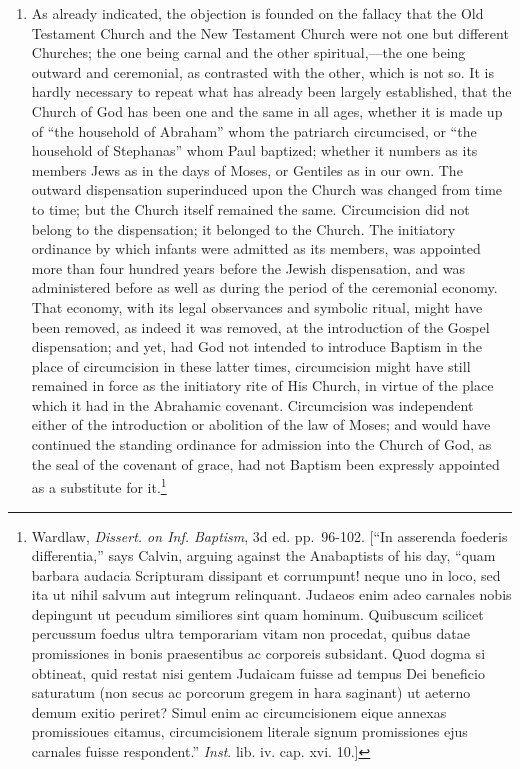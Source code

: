 \documentclass[]{book}
\providecommand{\tightlist}{%
  \setlength{\itemsep}{0pt}\setlength{\parskip}{0pt}}
\begin{document}
\begin{enumerate}
\def\labelenumi{\arabic{enumi}.}
\tightlist
\item
  As already indicated, the objection is founded on the fallacy that the Old Testament Church and the New Testament Church were not one but different Churches; the one being carnal and the other spiritual,---the one being outward and ceremonial, as contrasted with the other, which is not so. It is hardly necessary to repeat what has already been largely established, that the Church of God has been one and the same in all ages, whether it is made up of ``the household of Abraham'' whom the patriarch circumcised, or ``the household of Stephanas'' whom Paul baptized; whether it numbers as its members Jews as in the days of Moses, or Gentiles as in our own. The outward dispensation superinduced upon the Church was changed from time to time; but the Church itself remained the same. Circumcision did not belong to the dispensation; it belonged to the Church. The initiatory ordinance by which infants were admitted as its members, was appointed more than four hundred years before the Jewish dispensation, and was administered before as well as during the period of the ceremonial economy. That economy, with its legal observances and symbolic ritual, might have been removed, as indeed it was removed, at the introduction of the Gospel dispensation; and yet, had God not intended to introduce Baptism in the place of circumcision in these latter times, circumcision might have still remained in force as the initiatory rite of His Church, in virtue of the place which it had in the Abrahamic covenant. Circumcision was independent either of the introduction or abolition of the law of Moses; and would have continued the standing ordinance for admission into the Church of God, as the seal of the covenant of grace, had not Baptism been expressly appointed as a substitute for it.\footnote{Wardlaw, \emph{Dissert. on Inf. Baptism}, 3d ed. pp.~96-102. {[}``In asserenda foederis differentia,'' says Calvin, arguing against the Anabaptists of his day, ``quam barbara audacia Scripturam dissipant et corrumpunt! neque uno in loco, sed ita ut nihil salvum aut integrum relinquant. Judaeos enim adeo carnales nobis depingunt ut pecudum similiores sint quam hominum. Quibuscum scilicet percussum foedus ultra temporariam vitam non procedat, quibus datae promissiones in bonis praesentibus ac corporeis subsidant. Quod dogma si obtineat, quid restat nisi gentem Judaicam fuisse ad tempus Dei beneficio saturatum (non secus ac porcorum gregem in hara saginant) ut aeterno demum exitio periret? Simul enim ac circumcisionem eique annexas promissioues citamus, circumcisionem literale signum promissiones ejus carnales fuisse respondent.'' \emph{Inst}. lib. iv. cap. xvi. 10.{]}}
\end{enumerate}
\end{document}
